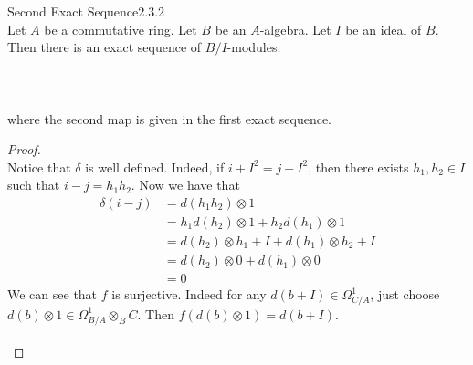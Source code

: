 \documentclass[a4paper]{article}
\begin{document}
\begin{thm}{Second Exact Sequence}{2.3.2}\\
Let $A$ be a commutative ring. Let $B$ be an $A$-algebra. Let $I$ be an ideal of $B$. Then there is an exact sequence of $B/I$-modules: \\~\\
\\~\\
where the second map is given in the first exact sequence. 
\begin{proof}\\
Notice that $\delta$ is well defined. Indeed, if $i+I^2=j+I^2$, then there exists $h_1,h_2\in I$ such that $i-j=h_1h_2$. Now we have that 
\begin{align*}
\delta(i-j)&=d(h_1h_2)\otimes 1\\
&=h_1d(h_2)\otimes 1+h_2d(h_1)\otimes 1\\
&=d(h_2)\otimes h_1+I+d(h_1)\otimes h_2+I\\
&=d(h_2)\otimes 0+d(h_1)\otimes 0\\
&=0
\end{align*}
We can see that $f$ is surjective. Indeed for any $d(b+I)\in\Omega_{C/A}^1$, just choose $d(b)\otimes 1\in\Omega_{B/A}^1\otimes_BC$. Then $f(d(b)\otimes 1)=d(b+I)$. \\~\\


\end{proof}
\end{thm}
\end{document}
